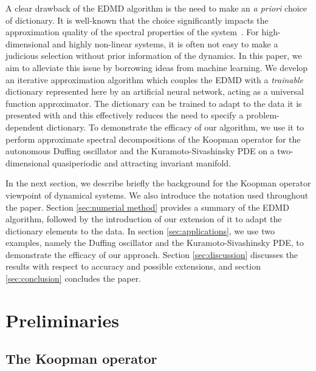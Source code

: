 \documentclass[%
 aip,
 cha,
 sd,%
 amsmath,amssymb,
 preprint,%
]{revtex4-1}
\begin{document}
A clear drawback of the EDMD algorithm is the need to make an {\it a priori} choice of dictionary. It is well-known that the choice significantly impacts the approximation quality of the spectral properties of the system~\cite{williams2014kernel,williams2015data,korda2017convergence}. For high-dimensional and highly non-linear systems, it is often not easy to make a judicious selection without prior information of the dynamics. 
In this paper, we aim to alleviate this issue by borrowing ideas from machine learning. We develop an iterative approximation algorithm which couples the EDMD with a {\it trainable} dictionary represented here by an artificial neural network, acting as a universal function approximator. The dictionary can be trained to adapt to the data it is presented with and this effectively reduces the need to specify a problem-dependent dictionary. 
To demonstrate the efficacy of our algorithm, we use it to perform approximate spectral decompositions of the Koopman operator for the autonomous Duffing oscillator and the Kuramoto-Sivashinsky PDE on a two-dimensional quasiperiodic and attracting invariant manifold. 

In the next section, we describe briefly the background for the Koopman operator viewpoint of dynamical systems. We also introduce the notation used throughout the paper.
Section \ref{sec:numerial method} provides a summary of the EDMD algorithm, followed by the introduction of our extension of it to adapt the dictionary elements to the data.
In section \ref{sec:applications}, we use two examples, namely the Duffing oscillator and the Kuramoto-Sivashinsky PDE, to demonstrate the efficacy of our approach.
Section \ref{sec:discussion} discusses the results with respect to accuracy and possible extensions, and section \ref{sec:conclusion} concludes the paper.

\section{Preliminaries\label{sec:preliminaries}}




\subsection{The Koopman operator}
\end{document}
